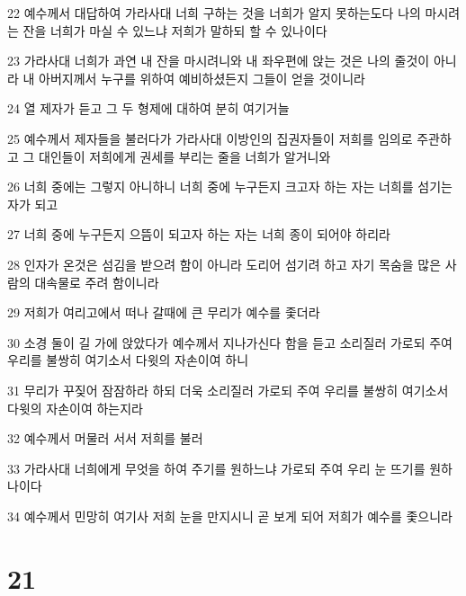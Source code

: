 \par 22 예수께서 대답하여 가라사대 너희 구하는 것을 너희가 알지 못하는도다 나의 마시려는 잔을 너희가 마실 수 있느냐 저희가 말하되 할 수 있나이다
\par 23 가라사대 너희가 과연 내 잔을 마시려니와 내 좌우편에 앉는 것은 나의 줄것이 아니라 내 아버지께서 누구를 위하여 예비하셨든지 그들이 얻을 것이니라
\par 24 열 제자가 듣고 그 두 형제에 대하여 분히 여기거늘
\par 25 예수께서 제자들을 불러다가 가라사대 이방인의 집권자들이 저희를 임의로 주관하고 그 대인들이 저희에게 권세를 부리는 줄을 너희가 알거니와
\par 26 너희 중에는 그렇지 아니하니 너희 중에 누구든지 크고자 하는 자는 너희를 섬기는 자가 되고
\par 27 너희 중에 누구든지 으뜸이 되고자 하는 자는 너희 종이 되어야 하리라
\par 28 인자가 온것은 섬김을 받으려 함이 아니라 도리어 섬기려 하고 자기 목숨을 많은 사람의 대속물로 주려 함이니라
\par 29 저희가 여리고에서 떠나 갈때에 큰 무리가 예수를 좇더라
\par 30 소경 둘이 길 가에 앉았다가 예수께서 지나가신다 함을 듣고 소리질러 가로되 주여 우리를 불쌍히 여기소서 다윗의 자손이여 하니
\par 31 무리가 꾸짖어 잠잠하라 하되 더욱 소리질러 가로되 주여 우리를 불쌍히 여기소서 다윗의 자손이여 하는지라
\par 32 예수께서 머물러 서서 저희를 불러
\par 33 가라사대 너희에게 무엇을 하여 주기를 원하느냐 가로되 주여 우리 눈 뜨기를 원하나이다
\par 34 예수께서 민망히 여기사 저희 눈을 만지시니 곧 보게 되어 저희가 예수를 좇으니라

\chapter{21}

